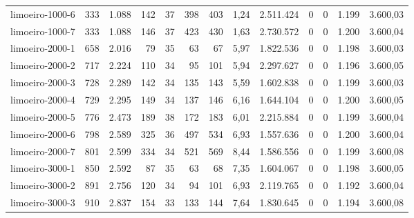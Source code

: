 \begin{table}[ht!]
{\begin{tabular}{lrrrrrrrrrrrr}
			\rowcolor{rowlight}limoeiro-1000-6                                                        & 333 & 1.088 & 142 & 37 & 398 & 403 & 1,24  & 2.511.424 & 0 & 0 & 1.199 & 3.600,03 \\
			\rowcolor{rowlight}limoeiro-1000-7                                                        & 333 & 1.088 & 146 & 37 & 423 & 430 & 1,63  & 2.730.572 & 0 & 0 & 1.200 & 3.600,04 \\
			\rowcolor{rowlight}limoeiro-2000-1                                                        & 658 & 2.016 & 79  & 35 & 63  & 67  & 5,97  & 1.822.536 & 0 & 0 & 1.198 & 3.600,03 \\
			\rowcolor{rowlight}limoeiro-2000-2                                                        & 717 & 2.224 & 110 & 34 & 95  & 101 & 5,94  & 2.297.627 & 0 & 0 & 1.196 & 3.600,05 \\
			\rowcolor{rowlight}limoeiro-2000-3                                                        & 728 & 2.289 & 142 & 34 & 135 & 143 & 5,59  & 1.602.838 & 0 & 0 & 1.199 & 3.600,03 \\
			\rowcolor{rowlight}limoeiro-2000-4                                                        & 729 & 2.295 & 149 & 34 & 137 & 146 & 6,16  & 1.644.104 & 0 & 0 & 1.200 & 3.600,05 \\
			\rowcolor{rowlight}limoeiro-2000-5                                                        & 776 & 2.473 & 189 & 38 & 172 & 183 & 6,01  & 2.215.884 & 0 & 0 & 1.199 & 3.600,04 \\
			\rowcolor{rowlight}limoeiro-2000-6                                                        & 798 & 2.589 & 325 & 36 & 497 & 534 & 6,93  & 1.557.636 & 0 & 0 & 1.200 & 3.600,04 \\
			\rowcolor{rowlight}limoeiro-2000-7                                                        & 801 & 2.599 & 334 & 34 & 521 & 569 & 8,44  & 1.586.556 & 0 & 0 & 1.199 & 3.600,08 \\
			\rowcolor{rowlight}limoeiro-3000-1                                                        & 850 & 2.592 & 87  & 35 & 63  & 68  & 7,35  & 1.604.067 & 0 & 0 & 1.198 & 3.600,05 \\
			\rowcolor{rowlight}limoeiro-3000-2                                                        & 891 & 2.756 & 120 & 34 & 94  & 101 & 6,93  & 2.119.765 & 0 & 0 & 1.192 & 3.600,04 \\
			\rowcolor{rowlight}limoeiro-3000-3                                                        & 910 & 2.837 & 154 & 33 & 133 & 144 & 7,64  & 1.830.645 & 0 & 0 & 1.194 & 3.600,08 \\

\end{tabular}}
\end{table}
